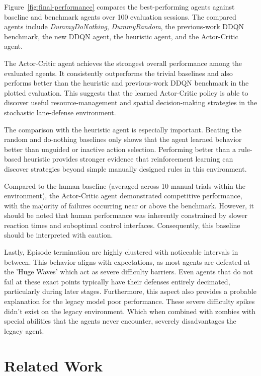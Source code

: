 \documentclass[conference,onecolumn]{IEEEtran}
\begin{document}
Figure~\ref{fig:final-performance} compares the best-performing agents against baseline and benchmark agents over 100 evaluation sessions. The compared agents include \textit{DummyDoNothing}, \textit{DummyRandom}, the previous-work DDQN benchmark, the new DDQN agent, the heuristic agent, and the Actor-Critic agent.

The Actor-Critic agent achieves the strongest overall performance among the evaluated agents. It consistently outperforms the trivial baselines and also performs better than the heuristic and previous-work DDQN benchmark in the plotted evaluation. This suggests that the learned Actor-Critic policy is able to discover useful resource-management and spatial decision-making strategies in the stochastic lane-defense environment.

The comparison with the heuristic agent is especially important. Beating the random and do-nothing baselines only shows that the agent learned behavior better than unguided or inactive action selection. Performing better than a rule-based heuristic provides stronger evidence that reinforcement learning can discover strategies beyond simple manually designed rules in this environment.

Compared to the human baseline (averaged across 10 manual trials within the environment), the Actor-Critic agent demonstrated competitive performance, with the majority of failures occurring near or above the benchmark. However, it should be noted that human performance was inherently constrained by slower reaction times and suboptimal control interfaces. Consequently, this baseline should be interpreted with caution.

Lastly, Episode termination are highly clustered with noticeable intervals in between. This behavior aligns with expectations, as most agents are defeated at the 'Huge Waves' which act as severe difficulty barriers. Even agents that do not fail at these exact points typically have their defenses entirely decimated, particularly during later stages. Furthermore, this aspect also provides a probable explanation for the legacy model poor performance. These severe difficulty spikes didn't exist on the legacy environment. Which when combined with zombies with special abilities that the agents never encounter, severely disadvantages the legacy agent.

\section{Related Work}
\label{sec:related_work}
\end{document}
